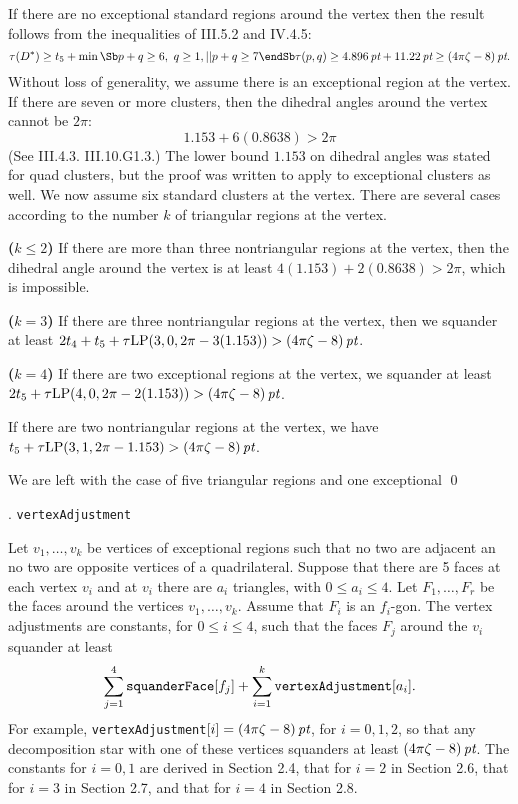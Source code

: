  If there are no exceptional standard regions around the
vertex then the result follows from the inequalities of III.5.2
and IV.4.5:
$$\tau(D^*)\ge t_5 + \min
	\Sb p+q\ge6,\ q\ge1,\\
		|| p+q\ge7
	\endSb
	\tau(p,q)\ge 4.896\,\pt+11.22\,\pt \ge \squander.$$
Without loss of generality, we assume there is an exceptional
region at the vertex.
If there are seven or more clusters,
 then the dihedral angles
around the vertex cannot be $2\pi$:
$$1.153 + 6 (0.8638)> 2\pi$$
(See III.4.3. III.10.G1.3.)
The lower bound $1.153$
on dihedral angles was stated
for quad clusters, but the proof was written to apply
to exceptional clusters as well.  We now assume six standard
clusters at the vertex. There are several cases according to
the number $k$ of triangular regions at the vertex.


{\bf($k\le2$)}
If there are more than three nontriangular regions at the vertex, then
the dihedral angle around the vertex
is at least $4(1.153)+2(0.8638)>2\pi$, which is impossible.

{\bf($k=3$)}
If there are three nontriangular regions at the vertex, then 
we squander at least $2t_4+t_5+\operatorname{\hbox{$\tau$}LP}(3,0,2\pi-3(1.153))>(4\pi\zeta-8)\,\hbox{\it pt}$.

{\bf($k=4$)}
If there are two exceptional regions at the vertex, 
we squander at least $2t_5+\operatorname{\hbox{$\tau$}LP}(4,0,2\pi-2(1.153))>(4\pi\zeta-8)\,\hbox{\it pt}$.

If there are two nontriangular regions at the vertex, 
we have $t_5+\operatorname{\hbox{$\tau$}LP}(3,1,2\pi-1.153)>(4\pi\zeta-8)\,\hbox{\it pt}$.

We are left with the case of five triangular regions and one exceptional
\qed
\enddemo

\bigskip

. {\tt vertexAdjustment}\endsubhead

Let $v_1,\ldots,v_k$ be vertices of exceptional regions such that
no two are adjacent an no two are opposite vertices of a quadrilateral.
Suppose that there are 5 faces at each vertex $v_i$ and
at $v_i$ there are $a_i$ triangles, with $0\le a_i\le4$.
Let $F_1,\ldots,F_r$ be the faces around the vertices
$v_1,\ldots,v_k$.  Assume that $F_i$ is an $f_i$-gon.
The vertex adjustments are constants, for $0\le i\le 4$, such
that the faces $F_j$ around the $v_i$ squander at least
$$\sum_{j=1}^4 \hbox{\tt squanderFace}[f_j]+\sum_{i=1}^k
	\hbox{\tt vertexAdjustment}[a_i].$$
For example, {\tt vertexAdjustment}$[i]=(4\pi\zeta-8)\,\hbox{\it pt}$, for $i=0,1,2$,
so that any decomposition star with one of these vertices squanders
at least $(4\pi\zeta-8)\,\hbox{\it pt}$.  The constants for $i=0,1$ are derived
in Section 2.4, that for $i=2$ in Section 2.6,
that for $i=3$ in Section 2.7, and that for
$i=4$ in Section 2.8.


